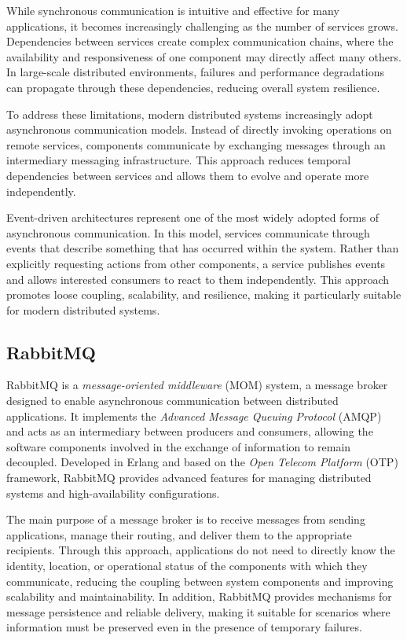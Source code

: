 \documentclass{scrartcl}
\begin{document}
While synchronous communication is intuitive and effective for many applications, it becomes increasingly challenging as the number of services grows. Dependencies between services create complex communication chains, where the availability and responsiveness of one component may directly affect many others. In large-scale distributed environments, failures and performance degradations can propagate through these dependencies, reducing overall system resilience.

To address these limitations, modern distributed systems increasingly adopt asynchronous communication models. Instead of directly invoking operations on remote services, components communicate by exchanging messages through an intermediary messaging infrastructure. This approach reduces temporal dependencies between services and allows them to evolve and operate more independently.

Event-driven architectures represent one of the most widely adopted forms of asynchronous communication. In this model, services communicate through events that describe something that has occurred within the system. Rather than explicitly requesting actions from other components, a service publishes events and allows interested consumers to react to them independently. This approach promotes loose coupling, scalability, and resilience, making it particularly suitable for modern distributed systems.

\subsection{RabbitMQ}

RabbitMQ is a \textit{message-oriented middleware} (MOM) system, a message broker designed to enable asynchronous communication between distributed applications. It implements the \textit{Advanced Message Queuing Protocol} (AMQP) and acts as an intermediary between producers and consumers, allowing the software components involved in the exchange of information to remain decoupled. Developed in Erlang and based on the \textit{Open Telecom Platform} (OTP) framework, RabbitMQ provides advanced features for managing distributed systems and high-availability configurations.

The main purpose of a message broker is to receive messages from sending applications, manage their routing, and deliver them to the appropriate recipients. Through this approach, applications do not need to directly know the identity, location, or operational status of the components with which they communicate, reducing the coupling between system components and improving scalability and maintainability. In addition, RabbitMQ provides mechanisms for message persistence and reliable delivery, making it suitable for scenarios where information must be preserved even in the presence of temporary failures.
\end{document}
